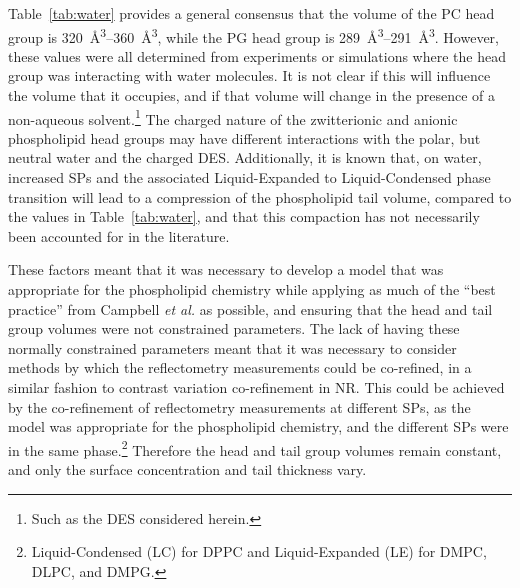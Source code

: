 Table~\ref{tab:water} provides a general consensus that the volume of the PC head group is \SIrange{320}{360}{\angstrom\cubed}, while the PG head group is \SIrange{289}{291}{\angstrom\cubed}.
However, these values were all determined from experiments\autocite{sun_order_1994,kucerka_determination_2004,balgavy_evaluation_2001,pan_molecular_2012} or simulations \autocite{armen_phospholipid_1998,kucerka_scattering_2012} where the head group was interacting with water molecules.
It is not clear if this will influence the volume that it occupies, and if that volume will change in the presence of a non-aqueous solvent.\footnote{Such as the DES considered herein.}
The charged nature of the zwitterionic and anionic phospholipid head groups may have different interactions with the polar, but neutral water and the charged DES.\autocite{sanchez-fernandez_self-assembly_2018}
Additionally, it is known that, on water, increased SPs and the associated Liquid-Expanded to Liquid-Condensed phase transition will lead to a compression of the phospholipid tail volume, compared to the values in Table~\ref{tab:water},\autocite{marsh_molecular_2010,small_lateral_1984} and that this compaction has not necessarily been accounted for in the literature.\autocite{campbell_structure_2018}

These factors meant that it was necessary to develop a model that was appropriate for the phospholipid chemistry while applying as much of the ``best practice'' from Campbell \emph{et al.}\autocite{campbell_structure_2018} as possible, and ensuring that the head and tail group volumes were not constrained parameters.
The lack of having these normally constrained parameters meant that it was necessary to consider methods by which the reflectometry measurements could be co-refined, in a similar fashion to contrast variation co-refinement in NR.
This could be achieved by the co-refinement of reflectometry measurements at different SPs, as the model was appropriate for the phospholipid chemistry, and the different SPs were in the same phase.\footnote{Liquid-Condensed (LC) for DPPC and Liquid-Expanded (LE) for DMPC, DLPC, and DMPG.}
Therefore the head and tail group volumes remain constant, and only the surface concentration and tail thickness vary.

